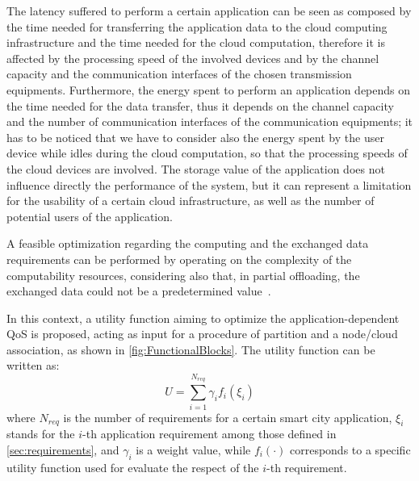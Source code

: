 \documentclass[twoside,openright]{report}
\begin{document}
The latency suffered to perform a certain application can be seen as composed by the time needed for transferring the application data to the cloud computing infrastructure and the time needed for the cloud computation, therefore it is affected by the processing speed of the involved devices and by the channel capacity and the communication interfaces of the chosen transmission equipments. 
Furthermore, the energy spent to perform an application depends on the time needed for the data transfer, thus it depends on the channel capacity and the number of communication interfaces of the communication equipments; it has to be noticed that we have to consider also the energy spent by the user device while idles during the cloud computation, so that the processing speeds of the cloud devices are involved. 
The storage value of the application does not influence directly the performance of the system, but it can represent a limitation for the usability of a certain cloud infrastructure, as well as the number of potential users of the application.

A feasible optimization regarding the computing and the exchanged data requirements can be performed by operating on the complexity of the computability resources, considering also that, in partial offloading, the exchanged data could not be a predetermined value~\cite{Challenges}. 

In this context, a utility function aiming to optimize the application-dependent \gls{QoS} is proposed, acting as input for a procedure of partition and a node/cloud association, as shown in \autoref{fig:FunctionalBlocks}. The utility function can be written as:
\begin{equation}
U =  \sum_{i=1}^{N_{req}}\gamma_i f_i(\xi_i)
\label{eq:global-utility}
\end{equation}
where $N_{req}$ is the number of requirements for a certain smart city application, $\xi_i$ stands for the $i$-th application requirement among those defined in \autoref{sec:requirements}, and $\gamma_i$ is a weight value, while $f_i(\cdot)$ corresponds to a specific utility function used for evaluate the respect of the $i$-th requirement. 
\end{document}
